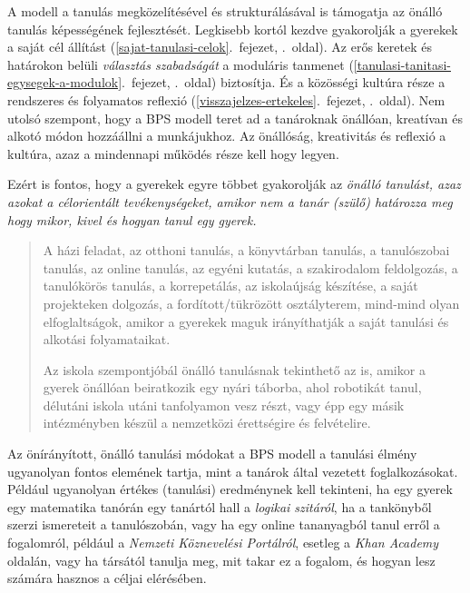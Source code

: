 A modell a tanulás megközelítésével és strukturálásával is támogatja az
önálló tanulás képességének fejlesztését. Legkisebb kortól kezdve
gyakorolják a gyerekek a
saját cél állítást (\ref{sajat-tanulasi-celok}.~fejezet, \pageref{sajat-tanulasi-celok}.~oldal).
Az erős keretek és határokon belüli \emph{választás szabadságát} a
moduláris tanmenet (\ref{tanulasi-tanitasi-egysegek-a-modulok}.~fejezet, \pageref{tanulasi-tanitasi-egysegek-a-modulok}.~oldal)
biztosítja. És a közösségi kultúra része a rendszeres és
folyamatos reflexió (\ref{visszajelzes-ertekeles}.~fejezet, \pageref{visszajelzes-ertekeles}.~oldal).
Nem utolsó szempont, hogy a BPS modell teret ad a tanároknak önállóan,
kreatívan és alkotó módon hozzáállni a munkájukhoz. Az önállóság,
kreativitás és reflexió a kultúra, azaz a mindennapi működés része kell
hogy legyen.

Ezért is fontos, hogy a gyerekek egyre többet gyakorolják az
\emph{önálló tanulást, azaz azokat a célorientált tevékenységeket,
amikor nem a tanár (szülő) határozza meg hogy mikor, kivel és hogyan
tanul egy gyerek.}

\begin{quote}
A házi feladat, az otthoni tanulás, a könyvtárban tanulás, a
tanulószobai tanulás, az online tanulás, az egyéni kutatás, a
szakirodalom feldolgozás, a tanulókörös tanulás, a korrepetálás, az
iskolaújság készítése, a saját projekteken dolgozás, a
fordított/tükrözött osztályterem, mind-mind olyan elfoglaltságok, amikor
a gyerekek maguk irányíthatják a saját tanulási és alkotási
folyamataikat.

Az iskola szempontjóbál önálló tanulásnak tekinthető az is, amikor a
gyerek önállóan beiratkozik egy nyári táborba, ahol robotikát tanul,
délutáni iskola utáni tanfolyamon vesz részt, vagy épp egy másik
intézményben készül a nemzetközi érettségire és felvételire.
\end{quote}

Az önírányított, önálló tanulási módokat a BPS modell a tanulási élmény
ugyanolyan fontos elemének tartja, mint a tanárok által vezetett
foglalkozásokat. Például ugyanolyan értékes (tanulási) eredménynek kell
tekinteni, ha egy gyerek egy matematika tanórán egy tanártól hall a
\emph{logikai szitáról}, ha a tankönyből szerzi ismereteit a
tanulószobán, vagy ha egy online tananyagból tanul erről a fogalomról,
például a
{\emph{Nemzeti
Köznevelési Portálról}}, esetleg a
{\emph{Khan
Academy}} oldalán, vagy ha társától tanulja meg, mit takar ez a fogalom,
és hogyan lesz számára hasznos a céljai elérésében.


